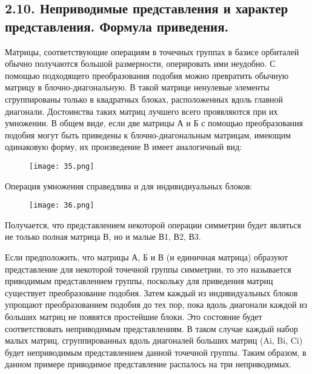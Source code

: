 
	\subsection{2.10. Неприводимые представления и характер представления. Формула приведения.} 
	
	\par\bigskip
	
	Матрицы, соответствующие операциям в точечных группах в
	базисе орбиталей обычно получаются большой размерности,
	оперировать ими неудобно. С помощью подходящего
	преобразования подобия можно превратить обычную матрицу в
	блочно-диагональную. В такой матрице ненулевые элементы
	сгруппированы только в квадратных блоках, расположенных вдоль
	главной диагонали. Достоинства таких матриц лучшего всего
	проявляются при их умножении. В общем виде, если две матрицы
	А и Б с помощью преобразования подобия могут быть приведены к
	блочно-диагональным матрицам, имеющим одинаковую форму, их
	произведение В имеет аналогичный вид:
	
		\begin{figure}[H]
		\centering
		{\texttt{[image: 35.png]}}
	\end{figure}
	
	
	Операция умножения справедлива и для индивидиуальных блоков:
	
		\begin{figure}[H]
		\centering
		{\texttt{[image: 36.png]}}
	\end{figure}
	
	
	
	Получается, что представлением некоторой операции симметрии
	будет являться не только полная матрица В, но и малые В1, В2, В3.
	
		\par\smallskip
	
	
	Если предположить, что матрицы А, Б и В (и единичная матрица)
	образуют представление для некоторой точечной группы
	симметрии, то это называется приводимым представлением
	группы, поскольку для приведения матриц существует
	преобразование подобия. Затем каждый из индивидуальных блоков
	упрощают преобразованием подобия до тех пор, пока вдоль
	диагонали каждой из больших матриц не появятся простейшие
	блоки. Это состояние будет соответствовать неприводимым
	представлениям. В таком случае каждый набор малых матриц,
	сгруппированных вдоль диагоналей больших матриц ({Ai, Bi, Ci})
	будет неприводимым представлением данной точечной группы.
	Таким образом, в данном примере приводимое представление
	распалось на три неприводимых.
	
